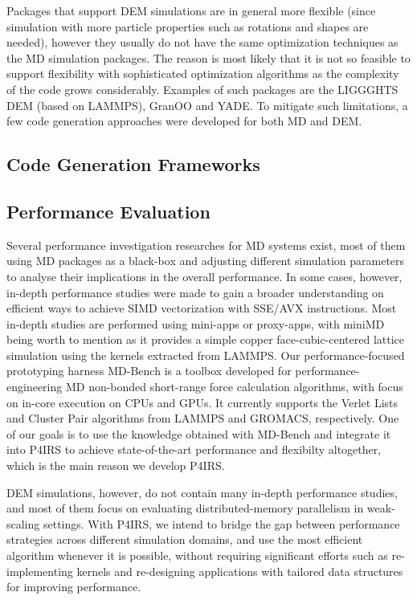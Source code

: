 \documentclass[preprint,12pt]{elsarticle}
\begin{document}
Packages that support DEM simulations are in general more flexible (since simulation with more particle properties such as rotations and shapes are needed), however they usually do not have the same optimization techniques as the MD simulation packages.
The reason is most likely that it is not so feasible to support flexibility with sophisticated optimization algorithms as the complexity of the code grows considerably.
Examples of such packages are the LIGGGHTS DEM (based on LAMMPS), GranOO and YADE.
To mitigate such limitations, a few code generation approaches were developed for both MD and DEM.

\subsection{Code Generation Frameworks}
\label{sec:codegen}


\subsection{Performance Evaluation}
\label{sec:perfeval}

Several performance investigation researches for MD systems exist, most of them using MD packages as a black-box and adjusting different simulation parameters to analyse their implications in the overall performance.
In some cases, however, in-depth performance studies were made to gain a broader understanding on efficient ways to achieve SIMD vectorization with SSE/AVX instructions.
Most in-depth studies are performed using mini-apps or proxy-apps, with miniMD being worth to mention as it provides a simple copper face-cubic-centered lattice simulation using the kernels extracted from LAMMPS.
Our performance-focused prototyping harness MD-Bench is a toolbox developed for performance-engineering MD non-bonded short-range force calculation algorithms, with focus on in-core execution on CPUs and GPUs.
It currently supports the Verlet Lists and Cluster Pair algorithms from LAMMPS and GROMACS, respectively.
One of our goals is to use the knowledge obtained with MD-Bench and integrate it into P4IRS to achieve state-of-the-art performance and flexibilty altogether, which is the main reason we develop P4IRS.

DEM simulations, however, do not contain many in-depth performance studies, and most of them focus on evaluating distributed-memory parallelism in weak-scaling settings.
With P4IRS, we intend to bridge the gap between performance strategies across different simulation domains, and use the most efficient algorithm whenever it is possible, without requiring significant efforts such as re-implementing kernels and re-designing applications with tailored data structures for improving performance.
\end{document}
